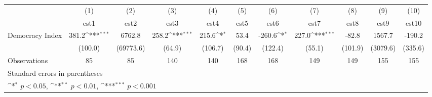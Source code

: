 {
\def\sym#1{\ifmmode^{#1}\else\(^{#1}\)\fi}
\begin{tabular}{l*{10}{c}}
\hline\hline
                    &\multicolumn{1}{c}{(1)}         &\multicolumn{1}{c}{(2)}         &\multicolumn{1}{c}{(3)}         &\multicolumn{1}{c}{(4)}         &\multicolumn{1}{c}{(5)}         &\multicolumn{1}{c}{(6)}         &\multicolumn{1}{c}{(7)}         &\multicolumn{1}{c}{(8)}         &\multicolumn{1}{c}{(9)}         &\multicolumn{1}{c}{(10)}         \\
                    &        est1         &        est2         &        est3         &        est4         &        est5         &        est6         &        est7         &        est8         &        est9         &       est10         \\
\hline
Democracy Index     &       381.2\sym{***}&      6762.8         &       258.2\sym{***}&       215.6\sym{*}  &        53.4         &      -260.6\sym{*}  &       227.0\sym{***}&       -82.8         &      1567.7         &      -190.2         \\
                    &     (100.0)         &   (69773.6)         &      (64.9)         &     (106.7)         &      (90.4)         &     (122.4)         &      (55.1)         &     (101.9)         &    (3079.6)         &     (335.6)         \\
\hline
Observations        &          85         &          85         &         140         &         140         &         168         &         168         &         149         &         149         &         155         &         155         \\
\hline\hline
\multicolumn{11}{l}{\footnotesize Standard errors in parentheses}\\
\multicolumn{11}{l}{\footnotesize \sym{*} \(p<0.05\), \sym{**} \(p<0.01\), \sym{***} \(p<0.001\)}\\
\end{tabular}
}
